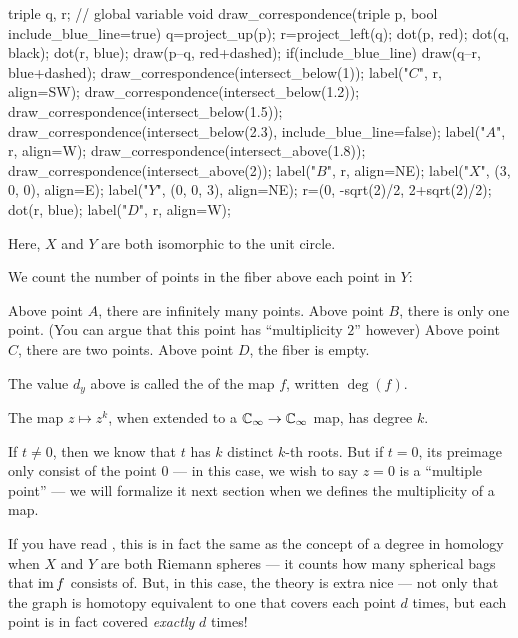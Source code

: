 \begin{example}
\begin{center}
\begin{asy}
		triple q, r; // global variable
		void draw_correspondence(triple p, bool include_blue_line=true){
			q=project_up(p);
			r=project_left(q);
			dot(p, red);
			dot(q, black);
			dot(r, blue);
			draw(p--q, red+dashed);
			if(include_blue_line) draw(q--r, blue+dashed);
		}
		draw_correspondence(intersect_below(1));
		label("$C$", r, align=SW);
		draw_correspondence(intersect_below(1.2));
		draw_correspondence(intersect_below(1.5));
		draw_correspondence(intersect_below(2.3), include_blue_line=false);
		label("$A$", r, align=W);
		draw_correspondence(intersect_above(1.8));
		draw_correspondence(intersect_above(2));
		label("$B$", r, align=NE);
		label("$X$", (3, 0, 0), align=E);
		label("$Y$", (0, 0, 3), align=NE);
		r=(0, -sqrt(2)/2, 2+sqrt(2)/2);
		dot(r, blue);
		label("$D$", r, align=W);
	\end{asy}
	\end{center}

	Here, $X$ and $Y$ are both isomorphic to the unit circle.

	We count the number of points in the fiber above each point in $Y$:
	\begin{itemize}
		\ii Above point $A$, there are infinitely many points.
		\ii Above point $B$, there is only one point. (You can argue that this point has
		``multiplicity $2$'' however)
		\ii Above point $C$, there are two points.
		\ii Above point $D$, the fiber is empty.
	\end{itemize}
\end{example}

\begin{definition}
	The value $d_y$ above is called the  of the map $f$, written $\deg(f)$.
\end{definition}

\begin{example}
	The map $z \mapsto z^k$, when extended to a $\mathbb C_\infty \to \mathbb C_\infty$ map, has degree $k$.
\end{example}
If $t \neq 0$, then we know that $t$ has $k$ distinct $k$-th roots.
But if $t = 0$, its preimage only consist of the point $0$ --- in this case, we wish to say $z = 0$
is a ``multiple point'' --- we will formalize it next section when we defines the multiplicity of a
map.

If you have read ,
this is in fact the same as the concept of a degree in homology when $X$ and $Y$ are both Riemann
spheres --- it counts how many spherical bags that $\operatorname{im} f$ consists of.
But, in this case, the theory is extra nice --- not only that the graph is homotopy equivalent to
one that covers each point $d$ times, but each point is in fact covered \emph{exactly} $d$ times!

